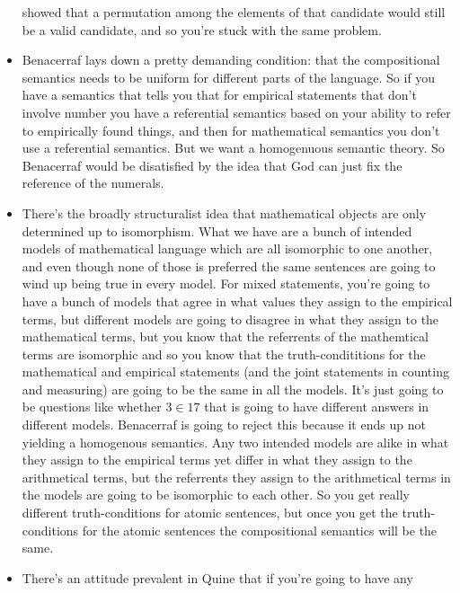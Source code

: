 \documentclass[12pt]{article}
\theoremstyle{definition}
\begin{document}
\begin{itemize}
        showed that a permutation among the elements of that candidate would
        still be a valid candidate, and so you're stuck with the same problem.
    \item
        Benacerraf lays down a pretty demanding condition: that the
        compositional semantics needs to be uniform for different parts of the
        language. So if you have a semantics that tells you that for empirical
        statements that don't involve number you have a referential semantics
        based on your ability to refer to empirically found things, and then
        for mathematical semantics you don't use a referential semantics. But
        we want a homogenuous semantic theory. So Benacerraf would be
        disatisfied by the idea that God can just fix the reference of the
        numerals.
    \item
        There's the broadly structuralist idea that mathematical objects are
        only determined up to isomorphism. What we have are a bunch of intended
        models of mathematical language which are all isomorphic to one
        another, and even though none of those is preferred the same sentences
        are going to wind up being true in every model. For mixed statements,
        you're going to have a bunch of models that agree in what values they
        assign to the empirical terms, but different models are going to
        disagree in what they assign to the mathematical terms, but you know
        that the referrents of the mathemtical terms are isomorphic and so you
        know that the truth-condititions for the mathematical and empirical
        statements (and the joint statements in counting and measuring) are
        going to be the same in all the models. It's just going to be questions
        like whether $3 \in 17$ that is going to have different answers in
        different models. Benacerraf is going to reject this because it ends up
        not yielding a homogenous semantics. Any two intended models are alike
        in what they assign to the empirical terms yet differ in what they
        assign to the arithmetical terms, but the referrents they assign to the
        arithmetical terms in the models are going to be isomorphic to each
        other. So you get really different truth-conditions for atomic
        sentences, but once you get the truth-conditions for the atomic
        sentences the compositional semantics will be the same.
    \item
        There's an attitude prevalent in Quine that if you're going to have any

\end{itemize}
\end{document}
